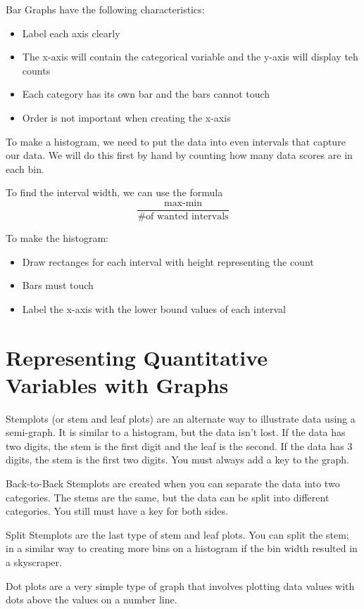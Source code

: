 \documentclass[../stats.tex]{subfiles}
\begin{document}
Bar Graphs have the following characteristics:
\begin{itemize}
    \item Label each axis clearly
    \item The x-axis will contain the categorical variable and the y-axis will display teh counts
    \item Each category has its own bar and the bars cannot touch
    \item Order is not important when creating the x-axis
\end{itemize}

To make a histogram, we need to put the data into even intervals that capture our data. 
We will do this first by hand by counting how many data scores are in each bin.

To find the interval width, we can use the formula 
\[\frac{\text{max-min}}{\text{\# of wanted intervals}}\]

To make the histogram:
\begin{itemize}
    \item Draw rectanges for each interval with height representing the count
    \item Bars must touch
    \item Label the x-axis with the lower bound values of each interval
\end{itemize}

\section{Representing Quantitative Variables with Graphs}
Stemplots (or stem and leaf plots) are an alternate way to illustrate data using a semi-graph. 
It is similar to a histogram, but the data isn't lost. If the data has two digits, the stem is the first digit and the leaf is the second. 
If the data has 3 digits, the stem is the first two digits. You must always add a key to the graph.

Back-to-Back Stemplots are created when you can separate the data into two categories. 
The stems are the same, but the data can be split into different categories. You still must have a key for both sides.

Split Stemplots are the last type of stem and leaf plots. 
You can split the stem; in a similar way to creating more bins on a histogram if the bin width resulted in a skyscraper.

Dot plots are a very simple type of graph that involves plotting data values with dots above the values on a number line.
\end{document}
